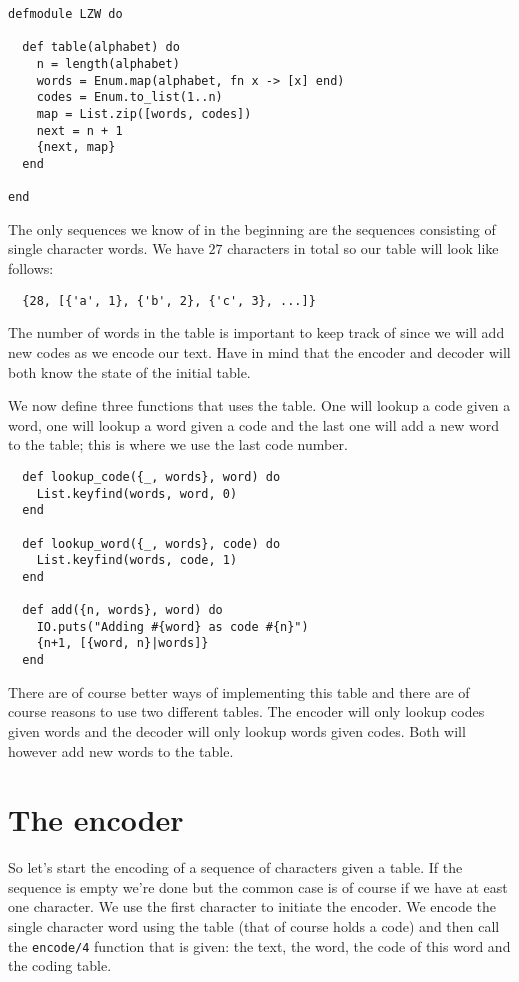 \documentclass[a4paper,11pt]{article}
\begin{document}
\begin{verbatim}
defmodule LZW do

  def table(alphabet) do
    n = length(alphabet)
    words = Enum.map(alphabet, fn x -> [x] end)
    codes = Enum.to_list(1..n)
    map = List.zip([words, codes])
    next = n + 1
    {next, map}
  end

end
\end{verbatim}

The only sequences we know of in the beginning are the sequences
consisting of single character words. We have $27$ characters in total so
our table will look like follows:

\begin{verbatim}
  {28, [{'a', 1}, {'b', 2}, {'c', 3}, ...]}
\end{verbatim}

The number of words in the table is important to keep track of
since we will add new codes as we encode our text. Have in mind that
the encoder and decoder will both know the state of the initial table.

We now define three functions that uses the table. One will lookup a
code given a word, one will lookup a word given a code and the last
one will add a new word to the table; this is where we use the last
code number.

\begin{verbatim}
  def lookup_code({_, words}, word) do
    List.keyfind(words, word, 0)
  end

  def lookup_word({_, words}, code) do
    List.keyfind(words, code, 1)
  end

  def add({n, words}, word) do
    IO.puts("Adding #{word} as code #{n}")
    {n+1, [{word, n}|words]}
  end
\end{verbatim}

There are of course better ways of implementing this table and there
are of course reasons to use two different tables. The encoder will
only lookup codes given words and the decoder will only lookup words
given codes. Both will however add new words to the table. 



\section{The encoder}

So let's start the encoding of a sequence of characters given a
table. If the sequence is empty we're done but the common case is of
course if we have at east one character. We use the first character to
initiate the encoder. We encode the single character word using the
table (that of course holds a code) and then call the {\tt encode/4}
function that is given: the text, the word, the code of this word and
the coding table.
\end{document}

